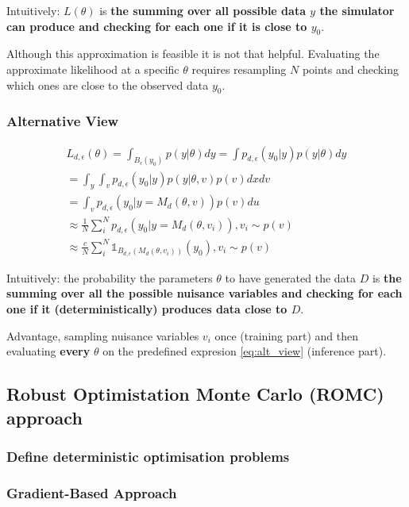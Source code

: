 \documentclass[11pt,twoside]{article}
\numberwithin{Theorem}{section}
\numberwithin{Definition}{section}
\numberwithin{Lemma}{section}
\numberwithin{Algorithm}{section}
\numberwithin{equation}{section}
\begin{document}
Intuitively: $L(\theta)$ is \textbf{the summing over all possible data $y$ the simulator can produce and checking for each one if it is close to $y_0$}.

Although this approximation is feasible it is not that helpful. Evaluating the approximate likelihood at a specific $\theta$ requires resampling $N$ points and checking which ones are close to the observed data $y_0$.

\subsubsection*{Alternative View}
\begin{gather} 
  L_{d,\epsilon}(\theta)=\int_{B_\epsilon(y_0)}p(y|\theta)dy = \int p_{d,\epsilon}(y_0|y)p(y|\theta)dy\\
  = \int_y \int_v p_{d,\epsilon}(y_0|y)p(y|\theta, v) p(v)dxdv \\
  = \int_v p_{d,\epsilon}(y_0|y=M_d(\theta, v)) p(v)du \\
  \approx \frac{1}{N} \sum_i^N p_{d,\epsilon} (y_0|y=M_d(\theta, v_i)), v_i \sim p(v) \\
  \approx \frac{c}{N} \sum_i^N \mathbb{1}_{B_{d,\epsilon}(M_d(\theta, v_i))} (y_0), v_i \sim p(v)
  \label{eq:alt_view}
\end{gather}

Intuitively: the probability the parameters $\theta$ to have generated the data $D$ is \textbf{the summing over all the possible nuisance variables and checking for each one if it (deterministically) produces data close to $D$}.

Advantage, sampling nuisance variables $v_i$ once (training part) and then evaluating \textbf{every} $\theta$ on the predefined expresion \ref{eq:alt_view} (inference part).

\subsection{Robust Optimistation Monte Carlo (ROMC) approach}
\label{sec:Techniques}

\subsubsection{Define deterministic optimisation problems}

\subsubsection{Gradient-Based Approach}
\end{document}
